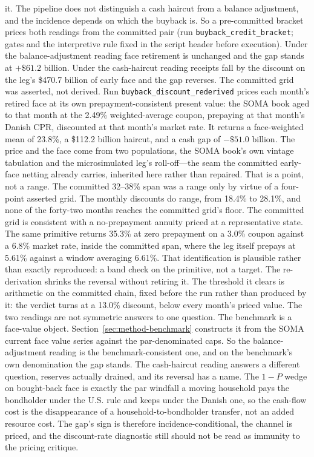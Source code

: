 \documentclass[12pt]{article}
\begin{document}
it. The pipeline does not distinguish a cash haircut from a balance adjustment, and the incidence depends on which the buyback is. So a pre-committed bracket prices both readings from the committed pair (run \texttt{buyback\_credit\_bracket}; gates and the interpretive rule fixed in the script header before execution). Under the balance-adjustment reading face retirement is unchanged and the gap stands at $+\$61.2$ billion. Under the cash-haircut reading receipts fall by the discount on the leg's \$470.7 billion of early face and the gap reverses. The committed grid was asserted, not derived. Run \texttt{buyback\_discount\_rederived} prices each month's retired face at its own prepayment-consistent present value: the SOMA book aged to that month at the 2.49\% weighted-average coupon, prepaying at that month's Danish CPR, discounted at that month's market rate. It returns a face-weighted mean of 23.8\%, a \$112.2 billion haircut, and a cash gap of $-\$51.0$ billion. The price and the face come from two populations, the SOMA book's own vintage tabulation and the microsimulated leg's roll-off---the seam the committed early-face netting already carries, inherited here rather than repaired. That is a point, not a range. The committed 32--38\% span was a range only by virtue of a four-point asserted grid. The monthly discounts do range, from 18.4\% to 28.1\%, and none of the forty-two months reaches the committed grid's floor. The committed grid is consistent with a no-prepayment annuity priced at a representative state. The same primitive returns 35.3\% at zero prepayment on a 3.0\% coupon against a 6.8\% market rate, inside the committed span, where the leg itself prepays at 5.61\% against a window averaging 6.61\%. That identification is plausible rather than exactly reproduced: a band check on the primitive, not a target. The re-derivation shrinks the reversal without retiring it. The threshold it clears is arithmetic on the committed chain, fixed before the run rather than produced by it: the verdict turns at a 13.0\% discount, below every month's priced value. The two readings are not symmetric answers to one question. The benchmark is a face-value object. Section~\ref{sec:method-benchmark} constructs it from the SOMA current face value series against the par-denominated caps. So the balance-adjustment reading is the benchmark-consistent one, and on the benchmark's own denomination the gap stands. The cash-haircut reading answers a different question, reserves actually drained, and its reversal has a name. The $1-P$ wedge on bought-back face is exactly the par windfall a moving household pays the bondholder under the U.S. rule and keeps under the Danish one, so the cash-flow cost is the disappearance of a household-to-bondholder transfer, not an added resource cost. The gap's sign is therefore incidence-conditional, the channel is priced, and the discount-rate diagnostic still should not be read as immunity to the pricing critique.
\end{document}
